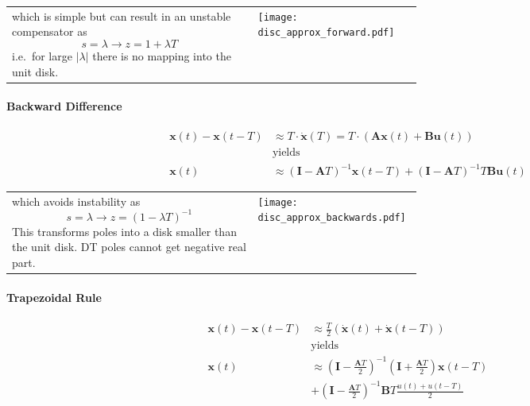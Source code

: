 \begin{tabularx}{\linewidth}{@{}m{0.6\linewidth}X@{}}
    which is simple but can result in an unstable compensator as
    \begin{equation*}
        s=\lambda \rightarrow z=1+\lambda T
    \end{equation*}
    i.e.\ for large $|\lambda|$ there is no mapping into the unit disk.
     &
    \texttt{[image: disc\_approx\_forward.pdf]}
\end{tabularx}

\paragraph{Backward Difference}
\noindent\begin{align*}
    \mathbf{x}(t)-\mathbf{x}(t-T) & \approx T\cdot\dot{\mathbf{x}}(T) =T\cdot(\mathbf{Ax}(t)+\mathbf{Bu}(t))                             \\
                                  & \text{yields}                                                                                        \\
    \mathbf{x}(t)                 & \approx{(\mathbf{I}-\mathbf{A}T)}^{-1}\mathbf{x}(t-T)+{(\mathbf{I}-\mathbf{A}T)}^{-1}T\mathbf{Bu}(t)
\end{align*}

\begin{tabularx}{\linewidth}{@{}m{0.6\linewidth}X@{}}
    which avoids instability as
    \begin{equation*}
        s=\lambda \rightarrow z={(1-\lambda T)}^{-1}
    \end{equation*}
    This transforms poles into a disk smaller than the unit disk. DT poles cannot get negative real part.
     &
    \texttt{[image: disc\_approx\_backwards.pdf]}
\end{tabularx}

\paragraph{Trapezoidal Rule}\label{disc::trapezoid}
\noindent\begin{align*}
    \mathbf{x}(t)-\mathbf{x}(t-T) & \approx \frac T2\left(\dot{\mathbf{x}}(t)+\dot{\mathbf{x}}(t-T)\right)                                                  \\
                                  & \text{yields}                                                                                                           \\
    \mathbf{x}(t)                 & \approx{\left(\mathbf{I}-\frac{\mathbf{A}T}{2}\right)}^{-1}\left(\mathbf{I}+\frac{\mathbf{A}T}{2}\right)\mathbf{x}(t-T) \\
                                  & +{\left(\mathbf{I}-\frac{\mathbf{A}T}{2}\right)}^{-1}\mathbf{B}T\frac{u(t)+u(t-T)}2
\end{align*}

